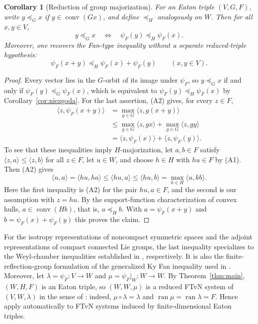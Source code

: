 \documentclass[11pt]{amsart}
\theoremstyle{plain}
\newtheorem{corollary}[theorem]{Corollary}
\theoremstyle{definition}
\theoremstyle{remark}
\newcommand{\ip}[2]{\langle #1,#2\rangle}
\newcommand{\conv}{\operatorname{conv}}
\begin{document}
\begin{corollary}[Reduction of group majorization]\label{cor:normal-majorization}
For an Eaton triple $(V,G,F)$, write $y\preceq_G x$ if
$y\in\conv(Gx)$, and define $\preceq_H$ analogously on $W$.
Then for all $x,y\in V$,
\[
y\preceq_G x\quad\Longleftrightarrow\quad
\psi_F(y)\preceq_H\psi_F(x).
\]
Moreover, one recovers the Fan-type inequality
\cite[Theorem~10]{Tam2000} without a separate reduced-triple hypothesis:
\[
\psi_F(x+y)\preceq_H\psi_F(x)+\psi_F(y)
\qquad (x,y\in V).
\]
\end{corollary}
\begin{proof}
Every vector lies in the $G$-orbit of its image under $\psi_F$, so $y\preceq_G x$ if and only if $\psi_F(y)\preceq_G\psi_F(x)$, which is equivalent to $\psi_F(y)\preceq_H\psi_F(x)$ by Corollary~\ref{cor:niezgoda}. For the last assertion, (A2) gives, for every $z\in F$,
\begin{align*}
\ip{z}{\psi_F(x+y)}
 &=\max_{g\in G}\ip{z}{g(x+y)}\\
 &\le \max_{g\in G}\ip{z}{gx}+\max_{g\in G}\ip{z}{gy}\\
 &=\ip{z}{\psi_F(x)}+\ip{z}{\psi_F(y)}.
\end{align*}
To see that these inequalities imply $H$-majorization, let $a,b\in F$ satisfy $\ip{z}{a}\le\ip{z}{b}$ for all $z\in F$, let $u\in W$, and choose $h\in H$ with $hu\in F$ by (A1). Then (A2) gives
\[
\ip{u}{a}=\ip{hu}{ha}\le\ip{hu}{a}
\le\ip{hu}{b}=\max_{k\in H}\ip{u}{kb}.
\]
Here the first inequality is (A2) for the pair $hu,a\in F$, and the second is our assumption with $z=hu$. By the support-function characterization of convex hulls, $a\in\conv(Hb)$, that is, $a\preceq_H b$. With $a=\psi_F(x+y)$ and $b=\psi_F(x)+\psi_F(y)$ this proves the claim.
\end{proof}

For the isotropy representations of noncompact symmetric spaces and the adjoint representations of compact connected Lie groups, the last inequality specializes to the Weyl-chamber inequalities established in \cite[Theorems~2 and~7]{Tam1998}, respectively. It is also the finite-reflection-group formulation of the generalized Ky Fan inequality used in \cite{Niezgoda2024}. Moreover, let $\lambda=\psi_F:V\to W$ and $\mu=\psi_F|_W:W\to W$. By Theorem~\ref{thm:main}, $(W,H,F)$ is an Eaton triple, so $(W,W,\mu)$ is a reduced FTvN system of $(V,W,\lambda)$ in the sense of \cite[Definition~10.1]{GowdaJeong2023}: indeed, $\mu\circ\lambda=\lambda$ and $\operatorname{ran}\mu=\operatorname{ran}\lambda=F$. Hence \cite[Theorem~10.3 and Corollary~10.4]{GowdaJeong2023} apply automatically to FTvN systems induced by finite-dimensional Eaton triples.
\end{document}

